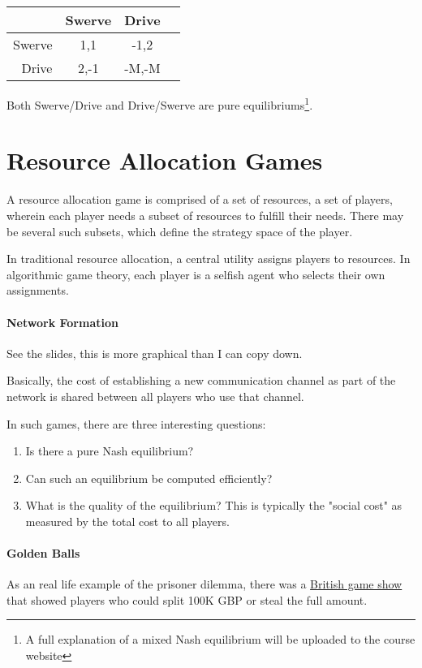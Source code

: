 \documentclass{idc_msc}
\begin{document}
\begin{tabu} to \linewidth{|r|c|c|c|}
\hline
& Swerve & Drive \\
\hline
Swerve & 1,1 & -1,2 \\
\hline
Drive & 2,-1 & -M,-M \\
\hline
\end{tabu}

Both Swerve/Drive and Drive/Swerve are pure equilibriums\footnote{A full explanation of a mixed Nash equilibrium will be uploaded to the course website}.

\section{Resource Allocation Games}

A resource allocation game is comprised of a set of resources, a set of players, wherein each player needs a subset of resources to fulfill their needs. There may be several such subsets, which define the strategy space of the player.

In traditional resource allocation, a central utility assigns players to resources.
In algorithmic game theory, each player is a selfish agent who selects their own assignments.

\paragraph{Network Formation}

See the slides, this is more graphical than I can copy down.

Basically, the cost of establishing a new communication channel as part of the network is shared between all players who use that channel.

In such games, there are three interesting questions:

\begin{enumerate}
  \item Is there a pure Nash equilibrium?
  \item Can such an equilibrium be computed efficiently?
  \item What is the quality of the equilibrium? This is typically the "social cost" as measured by the total cost to all players.
\end{enumerate}

\paragraph{Golden Balls}

As an real life example of the prisoner dilemma, there was a \href{https://en.wikipedia.org/wiki/Golden_Balls}{British game show} that showed players who could split 100K GBP or steal the full amount.
\end{document}
